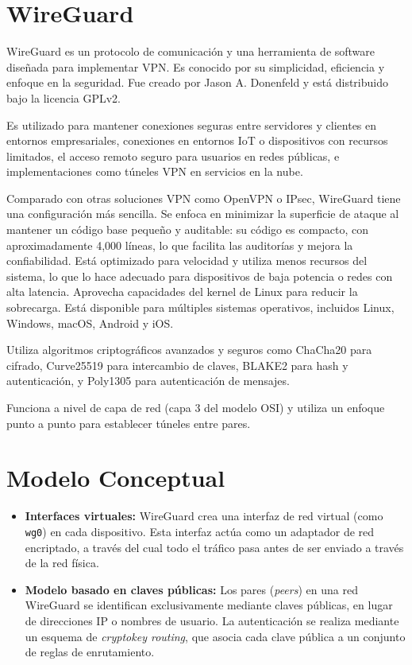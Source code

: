 \begin{enumerate}
\begin{enumerate}
   \section{WireGuard}
   
   WireGuard es un protocolo de comunicación y una herramienta de software diseñada para implementar VPN. Es conocido por su simplicidad, eficiencia y enfoque en la seguridad. Fue creado por Jason A. Donenfeld y está distribuido bajo la licencia GPLv2.
   
   Es utilizado para mantener conexiones seguras entre servidores y clientes en entornos empresariales, conexiones en entornos IoT o dispositivos con recursos limitados, el acceso remoto seguro para usuarios en redes públicas, e implementaciones como túneles VPN en servicios en la nube.
   
   Comparado con otras soluciones VPN como OpenVPN o IPsec, WireGuard tiene una configuración más sencilla. Se enfoca en minimizar la superficie de ataque al mantener un código base pequeño y auditable: su código es compacto, con aproximadamente 4,000 líneas, lo que facilita las auditorías y mejora la confiabilidad.
   Está optimizado para velocidad y utiliza menos recursos del sistema, lo que lo hace adecuado para dispositivos de baja potencia o redes con alta latencia. Aprovecha capacidades del kernel de Linux para reducir la sobrecarga. Está disponible para múltiples sistemas operativos, incluidos Linux, Windows, macOS, Android y iOS.
   
   Utiliza algoritmos criptográficos avanzados y seguros como ChaCha20 para cifrado, Curve25519 para intercambio de claves, BLAKE2 para hash y autenticación, y Poly1305 para autenticación de mensajes.
   
   Funciona a nivel de capa de red (capa 3 del modelo OSI) y utiliza un enfoque punto a punto para establecer túneles entre pares.

   \section*{Modelo Conceptual}
   \begin{itemize}
       \item \textbf{Interfaces virtuales:} WireGuard crea una interfaz de red virtual (como \texttt{wg0}) en cada dispositivo. Esta interfaz actúa como un adaptador de red encriptado, a través del cual todo el tráfico pasa antes de ser enviado a través de la red física.
       \item \textbf{Modelo basado en claves públicas:} Los pares (\textit{peers}) en una red WireGuard se identifican exclusivamente mediante claves públicas, en lugar de direcciones IP o nombres de usuario. La autenticación se realiza mediante un esquema de \textit{cryptokey routing}, que asocia cada clave pública a un conjunto de reglas de enrutamiento.
   \end{itemize}
   

\end{enumerate}
\end{enumerate}
